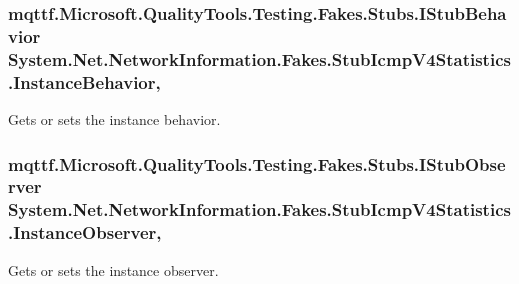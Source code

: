 \hypertarget{class_system_1_1_net_1_1_network_information_1_1_fakes_1_1_stub_icmp_v4_statistics_ac3175a7ff0925526808d301a0dcdfd21}{
\subsubsection[{Instance\-Behavior}]{\setlength{\rightskip}{0pt plus 5cm}mqttf.\-Microsoft.\-Quality\-Tools.\-Testing.\-Fakes.\-Stubs.\-I\-Stub\-Behavior System.\-Net.\-Network\-Information.\-Fakes.\-Stub\-Icmp\-V4\-Statistics.\-Instance\-Behavior\hspace{0.3cm}{\ttfamily [get]}, {\ttfamily [set]}}}\label{class_system_1_1_net_1_1_network_information_1_1_fakes_1_1_stub_icmp_v4_statistics_ac3175a7ff0925526808d301a0dcdfd21}


Gets or sets the instance behavior.

\hypertarget{class_system_1_1_net_1_1_network_information_1_1_fakes_1_1_stub_icmp_v4_statistics_a10ef5657c56429dd31c89a2a4df3e180}{
\subsubsection[{Instance\-Observer}]{\setlength{\rightskip}{0pt plus 5cm}mqttf.\-Microsoft.\-Quality\-Tools.\-Testing.\-Fakes.\-Stubs.\-I\-Stub\-Observer System.\-Net.\-Network\-Information.\-Fakes.\-Stub\-Icmp\-V4\-Statistics.\-Instance\-Observer\hspace{0.3cm}{\ttfamily [get]}, {\ttfamily [set]}}}\label{class_system_1_1_net_1_1_network_information_1_1_fakes_1_1_stub_icmp_v4_statistics_a10ef5657c56429dd31c89a2a4df3e180}


Gets or sets the instance observer.


